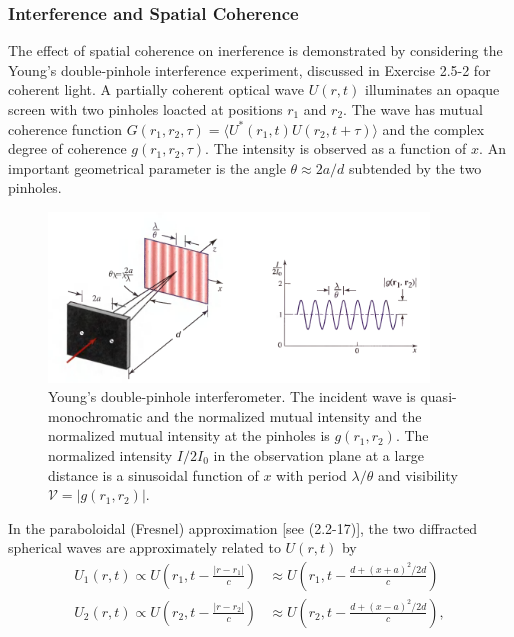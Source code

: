 \documentclass{article}
\numberwithin{figure}{subsection}
\numberwithin{table}{subsection}
\begin{document}
\subsubsection{Interference and Spatial Coherence}
\endgroup
The effect of spatial coherence on inerference is demonstrated by considering the Young's double-pinhole interference experiment, discussed in Exercise 2.5-2 for coherent light. A partially coherent optical wave $ U(r,t) $ illuminates an opaque screen with two pinholes loacted at positions $ r_1 $ and $ r_2 $. The wave has mutual coherence function $ G(r_1, r_2, \tau) = \langle U^\ast(r_1, t) U(r_2, t+\tau) \rangle $ and the complex degree of coherence $ g(r_1, r_2, \tau) $. The intensity is observed as a function of $x$. An important geometrical parameter is the angle $ \theta \approx 2a / d $ subtended by the two pinholes.
 \begin{figure}[H]
\centering
\includegraphics[width=0.9\textwidth]{11_2_4.PNG}
\caption{Young's double-pinhole interferometer. The incident wave is quasi-monochromatic and the normalized mutual intensity and the normalized mutual intensity at the pinholes is $ g(r_1, r_2) $. The normalized intensity $ I / 2 I_0 $ in the observation plane at a large distance is a sinusoidal function of $x$ with period $\lambda / \theta $ and visibility $ \mathcal{V} = \lvert g(r_1, r_2) \rvert $.}
\label{fig: 11_2_4}
\end{figure}
\par In the paraboloidal (Fresnel) approximation [see (2.2-17)], the two diffracted spherical waves are approximately related to $ U(r, t) $ by
\begin{subequations}
\begin{align}
U_1 (r, t) \propto U(r_1, t - \frac{\lvert r- r_1 \rvert}{c})  &\approx U(r_1, t - \frac{d + (x+a)^2 / 2d}{c})\\
U_2 (r, t) \propto U(r_2, t - \frac{\lvert r- r_2 \rvert}{c})  &\approx U(r_2, t - \frac{d + (x- a)^2 / 2d}{c}),
\end{align}
\end{subequations} 
\end{document}
